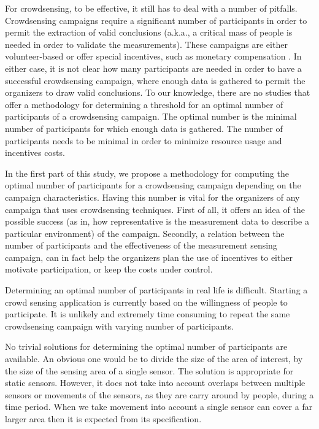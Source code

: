 For crowdsensing, to be effective, it still has to deal with a number of pitfalls. Crowdsensing campaigns require a significant number of participants in order to permit the extraction of valid conclusions (a.k.a., a critical mass of people is needed in order to validate the measurements). These campaigns are either volunteer-based or offer special incentives, such as monetary compensation \cite{ra2012medusa}. In either case, it is not clear how many participants are needed in order to have a successful crowdsensing campaign, where enough data is gathered to permit the organizers to draw valid conclusions. To our knowledge, there are no studies that offer a methodology for determining a threshold for an optimal number of participants of a crowdsensing campaign. The optimal number is the minimal number of participants for which enough data is gathered. The number of participants needs to be minimal in order to minimize resource usage and incentives costs.

In the first part of this study, we propose a methodology for computing the optimal number of participants for a crowdsensing campaign depending on the campaign characteristics. Having this number is vital for the organizers of any campaign that uses crowdsensing techniques. First of all, it offers an idea of the possible success (as in, how representative is the measurement data to describe a particular environment) of the campaign. Secondly, a relation between the number of participants and the effectiveness of the measurement sensing campaign, can in fact help the organizers plan the use of incentives to either motivate participation, or keep the costs under control.

Determining an optimal number of participants in real life is difficult. Starting a crowd sensing application is currently based on the willingness of people to participate. It is unlikely and extremely time consuming to repeat the same crowdsensing campaign with varying number of participants.

No trivial solutions for determining the optimal number of participants are available. An obvious one would be to divide the size of the area of interest, by the size of the sensing area of a single sensor. The solution is appropriate for static sensors. However, it does not take into account overlaps between multiple sensors or movements of the sensors, as they are carry around by people, during a time period. When we take movement into account a single sensor can cover a far larger area then it is expected from its specification.

